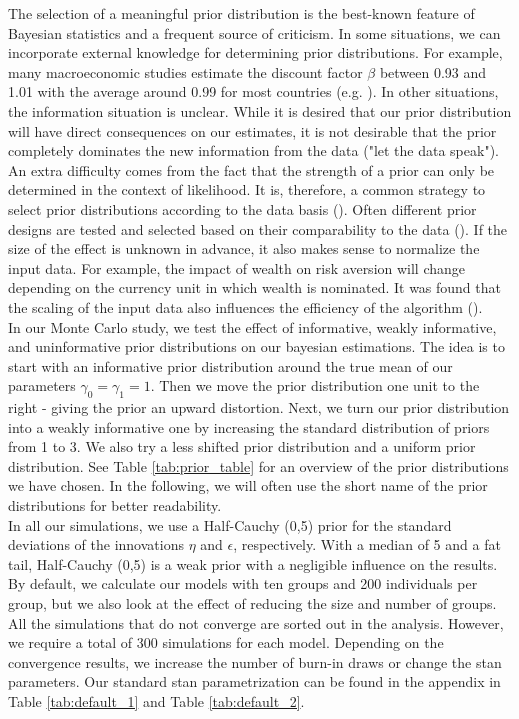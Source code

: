 The selection of a meaningful prior distribution is the best-known feature of Bayesian statistics and a frequent source of criticism. In some situations, we can incorporate external knowledge for determining prior distributions. For example, many macroeconomic studies estimate the discount factor $\beta$ between 0.93 and 1.01 with the average around 0.99 for most countries (e.g. \cite{rumler2007}).
In other situations, the information situation is unclear. While it is desired that our prior distribution will have direct consequences on our estimates, it is not desirable that the prior completely dominates the new information from the data ("let the data speak").\\
An extra difficulty comes from the fact that the strength of a prior can only be determined in the context of likelihood. It is, therefore, a common strategy to select prior distributions according to the data basis (\cite{gelman2017prior}).
Often different prior designs are tested and selected based on their comparability to the data (\cite{leeper2017clearing}).
If the size of the effect is unknown in advance, it also makes sense to normalize the input data. For example, the impact of wealth on risk aversion will change depending on the currency unit in which wealth is nominated. It was found that the scaling of the input data also influences the efficiency of the algorithm (\cite{gelman2008weakly}). \\
In our Monte Carlo study, we test the effect of informative, weakly informative, and uninformative prior distributions on our bayesian estimations.
The idea is to start with an informative prior distribution around the true mean of our parameters $\gamma_0=\gamma_1=1$. Then we move the prior distribution one unit to the right - giving the prior an upward distortion.
Next, we turn our prior distribution into a weakly informative one by increasing the standard distribution of priors from 1 to 3.
We also try a less shifted prior distribution and a uniform prior distribution. See Table \ref{tab:prior_table} for an overview of the prior distributions we have chosen. In the following, we will often use the short name of the prior distributions for better readability.\\
In all our simulations, we use a Half-Cauchy (0,5) prior for the standard deviations of the innovations $\eta$ and $\epsilon$, respectively. With a median of 5 and a fat tail, Half-Cauchy (0,5) is a weak prior with a negligible influence on the results.
By default, we calculate our models with ten groups and 200 individuals per group, but we also look at the effect of reducing the size and number of groups. All the simulations that do not converge are sorted out in the analysis.
However, we require a total of 300 simulations for each model. Depending on the convergence results, we increase the number of burn-in draws or change the stan parameters. Our standard stan parametrization can be found in the appendix in Table \ref{tab:default_1} and Table \ref{tab:default_2}.



